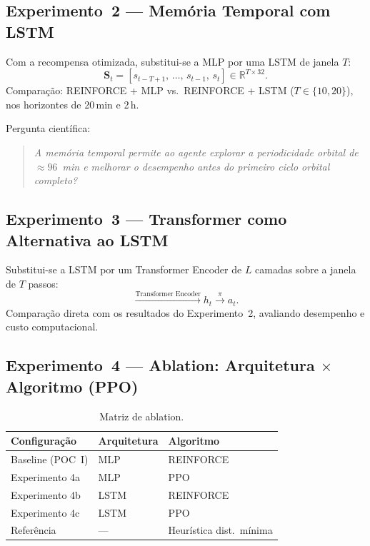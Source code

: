 \documentclass[12pt,a4paper]{article}
\begin{document}
\subsection{Experimento~2 --- Memória Temporal com LSTM}

Com a recompensa otimizada, substitui-se a MLP por uma LSTM de janela $T$:
\begin{equation}
  \mathbf{S}_t = [s_{t-T+1},\, \ldots,\, s_{t-1},\, s_t] \in \mathbb{R}^{T \times 32}.
\end{equation}
Comparação: REINFORCE + MLP vs.\ REINFORCE + LSTM ($T \in \{10, 20\}$), nos
horizontes de 20\,min e 2\,h.

Pergunta científica:
\begin{quote}
  \textit{A memória temporal permite ao agente explorar a periodicidade orbital
  de $\approx 96$~min e melhorar o desempenho antes do primeiro ciclo orbital
  completo?}
\end{quote}

\subsection{Experimento~3 --- Transformer como Alternativa ao LSTM}

Substitui-se a LSTM por um Transformer Encoder de $L$ camadas sobre a janela
de $T$ passos:
\begin{equation}
  [s_{t-T+1}, \ldots, s_t]
  \xrightarrow{\text{Transformer Encoder}} h_t
  \xrightarrow{\pi} a_t.
\end{equation}
Comparação direta com os resultados do Experimento~2, avaliando desempenho e
custo computacional.

\subsection{Experimento~4 --- Ablation: Arquitetura $\times$ Algoritmo (PPO)}

\begin{table}[H]
  \centering
  \caption{Matriz de ablation.}
  \label{tab:ablation}
  \begin{tabularx}{0.80\textwidth}{lXX}
    \toprule
    \textbf{Configuração}  & \textbf{Arquitetura} & \textbf{Algoritmo} \\
    \midrule
    Baseline (POC~I)       & MLP                  & REINFORCE          \\
    Experimento 4a         & MLP                  & PPO                \\
    Experimento 4b         & LSTM                 & REINFORCE          \\
    Experimento 4c         & LSTM                 & PPO                \\
    \addlinespace
    Referência             & ---                  & Heurística dist.\ mínima \\
    \bottomrule
  \end{tabularx}
\end{table}
\end{document}
